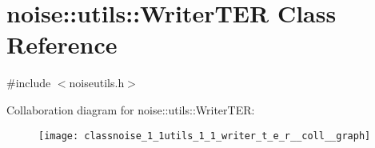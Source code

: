 \hypertarget{classnoise_1_1utils_1_1_writer_t_e_r}{\section{noise\+:\+:utils\+:\+:Writer\+T\+E\+R Class Reference}
\label{classnoise_1_1utils_1_1_writer_t_e_r}
}


{\ttfamily \#include $<$noiseutils.\+h$>$}



Collaboration diagram for noise\+:\+:utils\+:\+:Writer\+T\+E\+R\+:\nopagebreak
\begin{figure}[H]
\begin{center}
\leavevmode
\texttt{[image: classnoise\_1\_1utils\_1\_1\_writer\_t\_e\_r\_\_coll\_\_graph]}
\end{center}
\end{figure}

